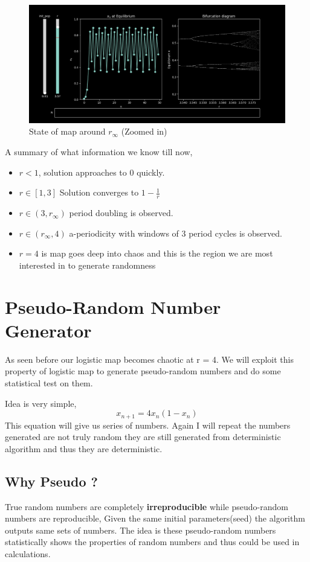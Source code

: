 \documentclass{report}
\begin{document}
\begin{figure}[!h]
    \centering
    \includegraphics[scale=.45]{images/rinfi.png}
    \caption{State of map around $r_{\infty}$ (Zoomed in)}
    \label{fig:my_label7}
\end{figure}

A summary of what information we know till now,

\begin{itemize}
  \item $r < 1$, solution approaches to 0 quickly.
  \item $r \in [1,3]$ Solution converges to $1-\frac{1}{r}$
  \item $r\in (3,r_{\infty})$ period doubling is observed.
  \item $r\in (r_{\infty},4)$ a-periodicity with windows  of 3 period  cycles is observed.
  \item $r=4$ is map goes deep into chaos and this is the region we are most interested in to generate randomness
\end{itemize}
\newpage

\section{Pseudo-Random Number Generator}

As seen before our logistic map becomes chaotic at r = 4. We will exploit this property of logistic map to generate pseudo-random numbers and do some statistical test on them.

Idea is very simple,
\begin{equation}
    x_{n+1} = 4x_n(1-x_n) \nonumber
\end{equation}
This equation will give us series of numbers. Again I will repeat the numbers generated are not truly random they are still generated from deterministic algorithm and thus they are deterministic.
\subsection{Why Pseudo ?}
True random numbers are completely \textbf{irreproducible} while pseudo-random numbers are reproducible, Given the same initial parameters(seed) the algorithm outputs same sets of numbers. The idea is these pseudo-random numbers statistically shows the properties of random numbers and thus could be used in calculations.
\newline
\end{document}
